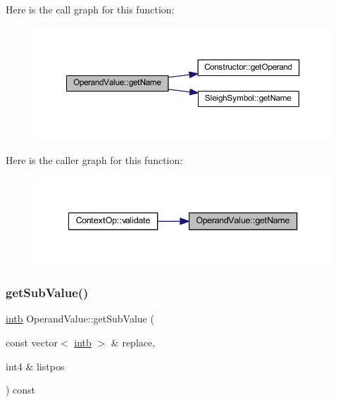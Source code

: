 Here is the call graph for this function\+:
\nopagebreak
\begin{figure}[H]
\begin{center}
\leavevmode
\includegraphics[width=350pt]{class_operand_value_ade99629239e3381551cf0872c6ed31e4_cgraph}
\end{center}
\end{figure}
Here is the caller graph for this function\+:
\nopagebreak
\begin{figure}[H]
\begin{center}
\leavevmode
\includegraphics[width=340pt]{class_operand_value_ade99629239e3381551cf0872c6ed31e4_icgraph}
\end{center}
\end{figure}
\mbox{\label{class_operand_value_a76d6f76e74edfb71ce1cd126c44a3788}} 
\subsubsection{\texorpdfstring{getSubValue()}{getSubValue()}}
{\footnotesize\ttfamily \mbox{\hyperlink{types_8h_aa925ba3e627c2df89d5b1cfe84fb8572}{intb}} Operand\+Value\+::get\+Sub\+Value (\begin{DoxyParamCaption}\item[{const vector$<$ \mbox{\hyperlink{types_8h_aa925ba3e627c2df89d5b1cfe84fb8572}{intb}} $>$ \&}]{replace,  }\item[{int4 \&}]{listpos }\end{DoxyParamCaption}) const\hspace{0.3cm}{\ttfamily [virtual]}}



